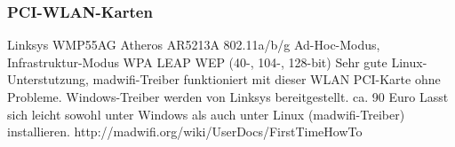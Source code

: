 \subsubsection{PCI-WLAN-Karten}

\begin{wlandevice}{Linksys WMP55AG}
\wlanchipset
Atheros AR5213A
\wlanieeestandard
802.11a/b/g
\wlanmode
Ad-Hoc-Modus, Infrastruktur-Modus
\wlansecurity
WPA
LEAP
WEP (40-, 104-, 128-bit)
\wlandriver
Sehr gute Linux-Unterstutzung, madwifi-Treiber funktioniert
mit dieser WLAN PCI-Karte ohne Probleme.
Windows-Treiber werden von Linksys bereitgestellt.
\wlanprice
ca. 90 Euro
\wlaninstall
Lasst sich leicht sowohl unter Windows als auch unter Linux (madwifi-Treiber) installieren.
http://madwifi.org/wiki/UserDocs/FirstTimeHowTo
\end{wlandevice}
